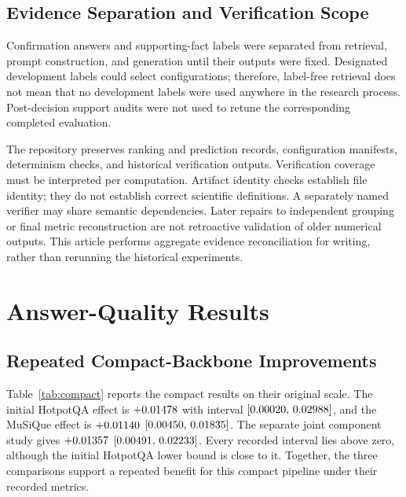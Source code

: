 \documentclass[11pt,a4paper]{article}
\begin{document}
\subsection{Evidence Separation and Verification Scope}
Confirmation answers and supporting-fact labels were separated from retrieval,
prompt construction, and generation until their outputs were fixed.
Designated development labels could select configurations; therefore,
label-free retrieval does not mean that no development labels were used
anywhere in the research process. Post-decision support audits were not used
to retune the corresponding completed evaluation.

The repository preserves ranking and prediction records, configuration
manifests, determinism checks, and historical verification outputs.
Verification coverage must be interpreted per computation. Artifact identity
checks establish file identity; they do not establish correct scientific
definitions. A separately named verifier may share semantic dependencies.
Later repairs to independent grouping or final metric reconstruction are not
retroactive validation of older numerical outputs. This article performs
aggregate evidence reconciliation for writing, rather than rerunning the
historical experiments.

\section{Answer-Quality Results}
\subsection{Repeated Compact-Backbone Improvements}
Table~\ref{tab:compact} reports the compact results on their original scale.
The initial HotpotQA effect is $+0.01478$ with interval $[0.00020,\,0.02988]$,
and the MuSiQue effect is $+0.01140$ $[0.00450,\,0.01835]$.
The separate joint component study gives $+0.01357$ $[0.00491,\,0.02233]$.
Every recorded interval lies above zero, although the initial HotpotQA
lower bound is close to it. Together, the three comparisons support a
repeated benefit for this compact pipeline under their recorded metrics.
\end{document}
